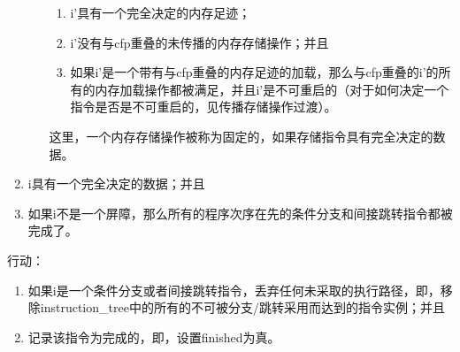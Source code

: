 \begin{enumerate}
\begin{enumerate}
    \begin{enumerate}
    \item i’具有一个完全决定的内存足迹； %
    \item i’没有与cfp重叠的未传播的内存存储操作；并且  %
    \item 如果i’是一个带有与cfp重叠的内存足迹的加载，那么与cfp重叠的i’的所有的内存加载操作都被满足，并且i’是不可重启的（对于如何决定一个指令是否是不可重启的，见传播存储操作过渡）。  %
    \end{enumerate}
  这里，一个内存存储操作被称为固定的，如果存储指令具有完全决定的数据。
  \end{enumerate}
\item i具有一个完全决定的数据；并且  %
\item 如果i不是一个屏障，那么所有的程序次序在先的条件分支和间接跳转指令都被完成了。  %
\end{enumerate}
行动：
\begin{enumerate}
\item 如果i是一个条件分支或者间接跳转指令，丢弃任何未采取的执行路径，即，移除instruction_tree中的所有的不可被分支/跳转采用而达到的指令实例；并且  %
\item 记录该指令为完成的，即，设置finished为真。  %
\end{enumerate}


